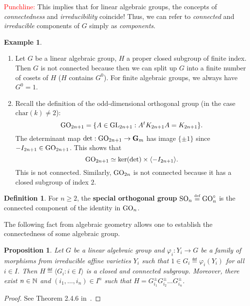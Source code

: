 \documentclass[]{pcmi}
\theoremstyle{plain}
\newtheorem{Proposition}[equation]{Proposition}
\theoremstyle{definition}
\newtheorem{Definition}[equation]{Definition}
\newtheorem{Example}[equation]{Example}
\begin{document}
\textcolor{red}{Punchline: } This implies that for linear algebraic groups, the concepts of \emph{connectedness} and \emph{irreducibility} coincide! Thus, we can refer to \emph{connected} and \emph{irreducible} components of $G$ simply as \emph{components}. 

\begin{Example}
    \phantom{h}
    \begin{enumerate}
        \item Let $G$ be a linear algebraic group, $H$ a proper closed subgroup of finite index. Then $G$ is not connected because then we can split up $G$ into a finite number of cosets of $H$ ($H$ contains $G^0$). For finite algebraic groups, we always have $G^0 = 1$. 

        \item Recall the definition of the odd-dimensional orthogonal group (in the case $\text{char}(k) \neq 2$):  
        \[
            \operatorname{GO}_{2n+1} = \{A \in \operatorname{GL}_{2n+1} : A^t K_{2n+1} A = K_{2n+1} \}. 
        \]
        The determinant map $\det : \operatorname{GO}_{2n+1} \to \mathbf{G}_m$ has image $\{\pm 1\}$ since $-I_{2n+1} \in \operatorname{GO}_{2n+1}$. This shows that 
        \[
            \operatorname{GO}_{2n+1} \simeq \ker (\det) \times \langle -I_{2n+1} \rangle. 
        \]
        This is not connected. Similarly, $\operatorname{GO}_{2n}$ is not connected because it has a closed subgroup of index $2$. 
    \end{enumerate}
\end{Example}

\begin{Definition}
    For $n \geq 2$, the \textbf{special orthogonal group} $\operatorname{SO}_n \overset{\textup{\tiny def}}= \operatorname{GO}_n^{\circ}$ is the connected component of the identity in $\operatorname{GO}_n$. 
\end{Definition}

The following fact from algebraic geometry allows one to establish the
connectedness of some algebraic group.

\begin{Proposition}
    Let $G$ be a linear algebraic group and $\varphi_i : Y_i \to G$ be a family of morphisms from irreducible affine varieties $Y_i$ such that $1 \in G_i \eqdef \varphi_i(Y_i)$ for all $i \in I$. Then $H \eqdef \langle G_i : i \in I \rangle$ is a closed and connected subgroup. Moreover, there exist $n \in \mathbb{N}$ and $(i_1, \ldots, i_n)  \in I^n$ such that $H = G_{i_1}^\pm G_{i_2}^\pm \ldots G_{i_n}^\pm$. 
\end{Proposition}

\begin{proof}
    See Theorem 2.4.6 in~\cite{Geck2013}. 
\end{proof}
\end{document}
